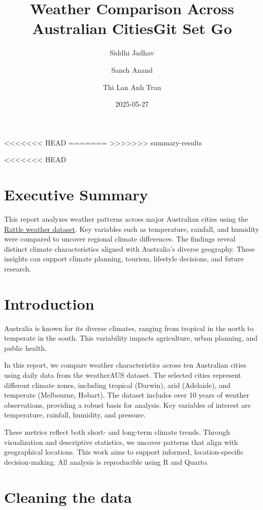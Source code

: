 \documentclass[
  letterpaper,
  DIV=11,
  numbers=noendperiod]{scrartcl}
\title{Weather Comparison Across Australian Cities}
\title{Git Set Go}
\author{Siddhi Jadhav \and Sanch Anand \and Thi Lan Anh Tran}
\date{2025-05-27}
\renewcommand*\contentsname{Table of contents}
\newcommand\contentsname{Table of contents}
\begin{document}
\maketitle

<<<<<<< HEAD
\renewcommand*\contentsname{Table of Contents}
=======
\renewcommand*\contentsname{Table of contents}
>>>>>>> summary-results
{
\hypersetup{linkcolor=}
\setcounter{tocdepth}{2}
\tableofcontents
}

<<<<<<< HEAD
\newpage

\section{Executive Summary}\label{executive-summary}

This report analyzes weather patterns across major Australian cities
using the
\href{https://www.kaggle.com/datasets/jsphyg/weather-dataset-rattle-package/data}{Rattle
weather dataset}. Key variables such as temperature, rainfall, and
humidity were compared to uncover regional climate differences. The
findings reveal distinct climate characteristics aligned with
Australia's diverse geography. These insights can support climate
planning, tourism, lifestyle decisions, and future research.

\section{Introduction}\label{introduction}

Australia is known for its diverse climates, ranging from tropical in
the north to temperate in the south. This variability impacts
agriculture, urban planning, and public health.

In this report, we compare weather characteristics across ten Australian
cities using daily data from the weatherAUS dataset. The selected cities
represent different climate zones, including tropical (Darwin), arid
(Adelaide), and temperate (Melbourne, Hobart). The dataset includes over
10 years of weather observations, providing a robust basis for analysis.
Key variables of interest are temperature, rainfall, humidity, and
pressure.

These metrics reflect both short- and long-term climate trends. Through
visualization and descriptive statistics, we uncover patterns that align
with geographical locations. This work aims to support informed,
location-specific decision-making. All analysis is reproducible using R
and Quarto.

\section{Cleaning the data}\label{cleaning-the-data}
\end{document}
